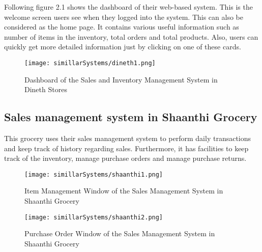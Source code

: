 \documentclass[12pt]{report}
\begin{document}
Following figure 2.1 shows the dashboard of their web-based system. This is the welcome screen users see when they logged into the system. This can also be considered as the home page. It contains various useful information such as number of items in the inventory, total orders and total products. Also, users can quickly get more detailed information just by clicking on one of these cards.

\begin{figure}[H]
	\centering
	\texttt{[image: simillarSystems/dineth1.png]}
	\caption{Dashboard of the Sales and Inventory Management System in Dineth Stores}
\end{figure}

\subsection{Sales management system in Shaanthi Grocery}

This grocery uses their sales management system to perform daily transactions and keep track of history regarding sales.  Furthermore, it has facilities to keep track of the inventory, manage purchase orders and manage purchase returns.

\begin{figure}[H]
	\centering
	\texttt{[image: simillarSystems/shaanthi1.png]}
	\caption{Item Management Window of the Sales Management System in Shaanthi Grocery}
\end{figure}

\begin{figure}[H]
	\centering
	\texttt{[image: simillarSystems/shaanthi2.png]}
	\caption{Purchase Order Window of the Sales Management System in Shaanthi Grocery}
\end{figure}
\end{document}
